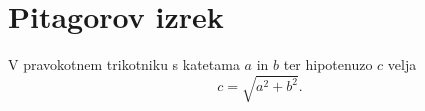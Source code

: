 \documentclass{article}
\begin{document}
\section*{Pitagorov izrek}
V pravokotnem trikotniku s katetama \(a\) in \(b\) ter hipotenuzo \(c\) velja
\begin{equation}
    c = \sqrt{a^2 + b^2}.
    \end{equation}
\end{document}
